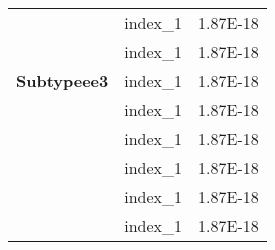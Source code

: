 \begin{longtable}{@{\extracolsep{\fill}}lll@{}}
                                          & index\_1                            & 1.87E-18            \\
                                          & index\_1                            & 1.87E-18            \\
\textbf{Subtypeee3}                       & index\_1                            & 1.87E-18            \\
                                          & index\_1                            & 1.87E-18            \\
                                          & index\_1                            & 1.87E-18            \\
                                          & index\_1                            & 1.87E-18            \\
                                          & index\_1                            & 1.87E-18            \\
                                          & index\_1                            & 1.87E-18            \\
                                          \bottomrule

\end{longtable}